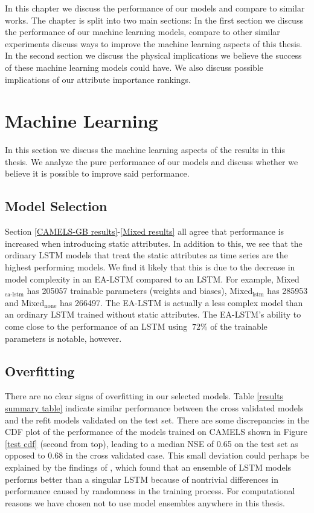 In this chapter we discuss the performance of our models and compare to similar 
works. The chapter is split into two main sections: In the first section we 
discuss the performance of our machine learning models, compare to other similar 
experiments discuss ways to improve the machine learning aspects of this thesis.
In the second section we discuss the physical implications we believe the success 
of these machine learning models could have. We also discuss possible implications 
of our attribute importance rankings. 
\section{Machine Learning}
In this section we discuss the machine learning aspects of the results in this thesis.
We analyze the pure performance of our models and discuss whether we believe it 
is possible to improve said performance.
\subsection{Model Selection}
\label{discuss model selection}
Section \ref{CAMELS-GB results}-\ref{Mixed results} 
all agree that performance is increased when introducing static attributes. In 
addition to this, we see that the ordinary LSTM models that treat the static 
attributes as time series are the highest performing models. We find it likely that 
this is due  to the decrease in model complexity in an EA-LSTM compared to an LSTM. 
For example, Mixed$_\text{ea-lstm}$ has 205057 trainable parameters (weights and 
biases), Mixed$_\text{lstm}$ has 285953 and Mixed$_\text{none}$ has 266497. The 
EA-LSTM is actually a less complex model than an ordinary LSTM trained without 
static attributes. The EA-LSTM's ability to come close to the performance of an 
LSTM using $~72\%$ of the trainable parameters is notable, however. 
\subsection{Overfitting}
There are no clear signs of overfitting in our selected models. Table 
\ref{results summary table} indicate 
similar performance between the cross validated models and the refit models 
validated on the test set. There are some discrepancies in the CDF plot of 
the performance of the models trained on CAMELS 
shown in Figure \ref{test cdf} (second from top), leading to a median NSE of 
0.65 on the test set as opposed to 0.68 in the cross validated case. This small 
deviation could perhaps be explained by the findings of \citet{lstm_second_paper},
 which found that an ensemble of LSTM models performs better than a singular LSTM 
 because of nontrivial differences in performance caused by randomness in the 
 training process. For computational reasons we have chosen not to use model 
 ensembles anywhere in this thesis.

